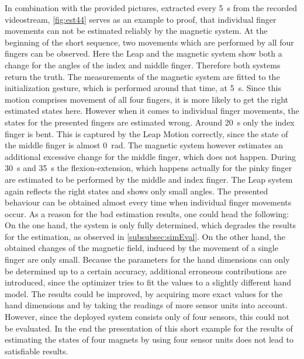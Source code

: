 In combination with the provided pictures, extracted every \SI{5}{\second} from the recorded videostream, \ref{fig:est44} serves as an example to proof, that individual finger movements can not be estimated reliably by the magnetic system. At the beginning of the short sequence, two movements which are performed by all four fingers can be observed. Here the Leap and the magnetic system show both a change for the angles of the index and middle finger. Therefore both systems return the truth. The measurements of the magnetic system are fitted to the initialization gesture, which is performed around that time, at \SI{5}{\second}. Since this motion comprises movement of all four fingers, it is more likely to get the right estimated states here. However when it comes to individual finger movements, the states for the presented fingers are estimated wrong. Around \SI{20}{\second} only the index finger is bent. This is captured by the Leap Motion correctly, since the state of the middle finger is almost \SI{0}{\radian}. The magnetic system however estimates an additional excessive change for the middle finger, which does not happen. During \SI{30}{\second} and \SI{35}{\second} the flexion-extension, which happens actually for the pinky finger are estimated to be performed by the middle and index finger. The Leap system again reflects the right states and shows only small angles. The presented behaviour can be obtained almost every time when individual finger movements occur. As a reason for the bad estimation results, one could head the following: On the one hand, the system is only fully determined, which degrades the results for the estimation, as observed in \ref{subsubsec:simEval}. On the other hand, the obtained changes of the magnetic field, induced by the movement of a single finger are only small. Because the parameters for the hand dimensions can only be determined up to a certain accuracy, additional erroneous contributions are introduced, since the optimizer tries to fit the values to a slightly different hand model. The results could be improved, by acquiring more exact values for the hand dimensions and by taking the readings of more sensor units into account. However, since the deployed system consists only of four sensors, this could not be evaluated. In the end the presentation of this short example for the results of estimating the states of four magnets by using four sensor units does not lead to satisfiable results. 

